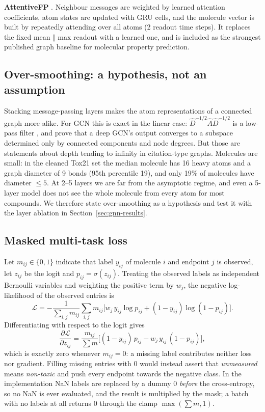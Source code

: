 \documentclass[conference]{IEEEtran}
\begin{document}
\textbf{AttentiveFP} \citep{xiong2020attentivefp}. Neighbour messages are weighted by learned
attention coefficients, atom states are updated with GRU cells, and the molecule vector is built
by repeatedly attending over all atoms (2 readout time steps). It replaces the fixed mean$\|$max
readout with a learned one, and is included as the strongest published graph baseline for
molecular property prediction.

\subsection{Over-smoothing: a hypothesis, not an assumption}
Stacking message-passing layers makes the atom representations of a connected graph more alike.
For GCN this is exact in the linear case: $\hat D^{-1/2}\hat A\hat D^{-1/2}$ is a low-pass
filter \citep{li2018oversmooth}, and \citet{oono2020expressive} prove that a deep GCN's output
converges to a subspace determined only by connected components and node degrees. But those are
statements about depth tending to infinity in citation-type graphs. Molecules are small: in the
cleaned Tox21 set the median molecule has 16 heavy atoms and a graph diameter of 9 bonds (95th
percentile 19), and only 19\% of molecules have diameter $\le 5$. At 2--5 layers we are far from
the asymptotic regime, and even a 5-layer model does not see the whole molecule from every atom
for most compounds. We therefore state over-smoothing as a hypothesis and test it with the layer
ablation in Section~\ref{sec:gnn-results}.

\subsection{Masked multi-task loss}
Let $m_{ij}\in\{0,1\}$ indicate that label $y_{ij}$ of molecule $i$ and endpoint $j$ is observed,
let $z_{ij}$ be the logit and $p_{ij}=\sigma(z_{ij})$. Treating the observed labels as
independent Bernoulli variables and weighting the positive term by $w_j$, the negative
log-likelihood of the observed entries is
\begin{equation}
\mathcal L = -\frac{1}{\sum_{i,j}m_{ij}}\sum_{i,j}m_{ij}\Big[
w_j\,y_{ij}\log p_{ij}+(1-y_{ij})\log(1-p_{ij})\Big].
\end{equation}
Differentiating with respect to the logit gives
\begin{equation}
\frac{\partial\mathcal L}{\partial z_{ij}}
=\frac{m_{ij}}{\sum m}\Big[(1-y_{ij})\,p_{ij}-w_j\,y_{ij}\,(1-p_{ij})\Big],
\end{equation}
which is exactly zero whenever $m_{ij}=0$: a missing label contributes neither loss nor
gradient. Filling missing entries with 0 would instead assert that \emph{unmeasured} means
\emph{non-toxic} and push every endpoint towards the negative class. In the implementation NaN
labels are replaced by a dummy 0 \emph{before} the cross-entropy, so no NaN is ever evaluated,
and the result is multiplied by the mask; a batch with no labels at all returns 0 through the
clamp $\max(\sum m,1)$.
\end{document}
